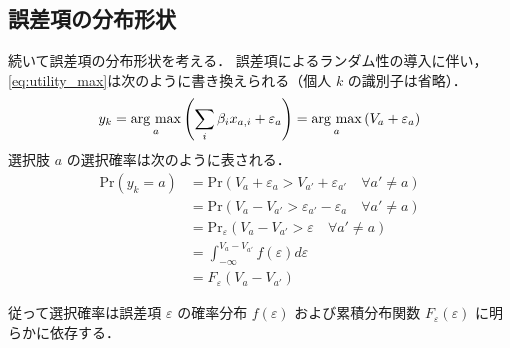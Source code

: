 \subsection{誤差項の分布形状}\label{ssec:error_distribution}
続いて誤差項の分布形状を考える．
誤差項によるランダム性の導入に伴い，\eqref{eq:utility_max}は次のように書き換えられる（個人 $k$ の識別子は省略）．
\begin{equation}\label{eq:utility_max_random}
y_k = \argmax_{a} \left( \sum_{i} \beta_{i} x_{a, i} + \varepsilon_a \right) = \argmax_{a} \left( V_a + \varepsilon_a \right)
\end{equation}
選択肢 $a$ の選択確率は次のように表される．
\begin{equation}\label{eq:choice_prob}
  \begin{aligned}
    \text{Pr}(y_k = a) &= \text{Pr}\left( V_a + \varepsilon_a > V_{a'} + \varepsilon_{a'} \quad \forall a' \neq a \right) \\
    &= \text{Pr}\left( V_a - V_{a'} > \varepsilon_{a'} - \varepsilon_a \quad \forall a' \neq a \right) \\
    &= \text{Pr}_{\varepsilon}\left( V_a - V_{a'} > \varepsilon \quad \forall a' \neq a \right) \\
    &= \int_{-\infty}^{V_a - V_{a'}} f(\varepsilon) d\varepsilon \\
    &= F_{\varepsilon}(V_a - V_{a'})
  \end{aligned}
\end{equation}

従って選択確率は誤差項 $\varepsilon$ の確率分布 $f(\varepsilon)$ および累積分布関数 $F_{\varepsilon}(\varepsilon)$ に明らかに依存する．



